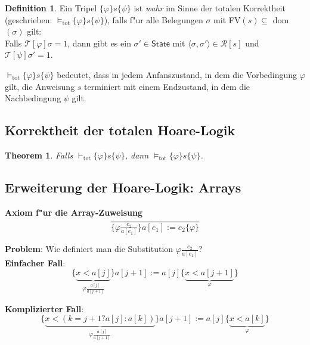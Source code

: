 \documentclass[german,10pt, a4paper, twocolumn]{scrartcl}
\newtheorem{theorem}{Theorem}[section]
\theoremstyle{definition}
\newtheorem{definition}{Definition}[section]
\theoremstyle{remark}
\begin{document}
\begin{definition}
	Ein Tripel $\{ \varphi \} s \{ \psi \}$ ist \textit{wahr} im Sinne der totalen Korrektheit (geschrieben: $\vDash_{\mbox{tot}} \{\varphi \}s\{ \psi \} $), falls f"ur alle Belegungen $\sigma$ mit FV$(s)\subseteq$ dom$(\sigma)$ gilt:\\

	Falls $\mathcal{T}[\varphi]\sigma = 1$, dann gibt es ein $\sigma' \in \textsf{State}$ mit $\langle \sigma, \sigma' \rangle \in \mathcal{R}[s]$ und $\mathcal{T}[\psi]\sigma' =1$.
\end{definition}

$\vDash_{\mbox{tot}} \{ \varphi \} s \{ \psi \}$ bedeutet, dass in jedem Anfanszustand, in dem die Vorbedingung $\varphi$ gilt, die Anweisung $s$ terminiert mit einem Endzustand, in dem die Nachbedingung $\psi$ gilt.

\subsection{Korrektheit der totalen Hoare-Logik}

\begin{theorem}
	Falls $\vdash_{\mbox{tot}} \{ \varphi \} s \{ \psi \}$, dann $\vDash_{\mbox{tot}} \{\varphi \} s \{ \psi \}$.
\end{theorem}

\subsection{Erweiterung der Hoare-Logik: Arrays}

\textbf{Axiom f"ur die Array-Zuweisung}\\

\begin{displaymath}
	\frac{}{\{ \varphi \frac{e_2}{a[e_1]} \} a[e_1] := e_2 \{ \varphi \}}
\end{displaymath}

\textbf{Problem}: Wie definiert man die Substitution $\varphi \frac{e_2}{a[e_1]}$?\\

\textbf{Einfacher Fall}:
\small
\begin{displaymath}
	\{\underbrace{x < a[j]}_{\varphi\frac{a[j]}{a[j+1]}}\} a[j+1] := a[j] \{ \underbrace{x < a[j+1]}_{\varphi} \}
\end{displaymath}
\normalsize

\textbf{Komplizierter Fall}:
\small
\begin{displaymath}
	\{\underbrace{x < (k=j+1 ? a[j] : a[k])}_{\varphi\frac{a[j]}{a[j+1]}}\} a[j+1] := a[j] \{ \underbrace{x < a[k]}_{\varphi} \}
\end{displaymath}
\normalsize
\end{document}
